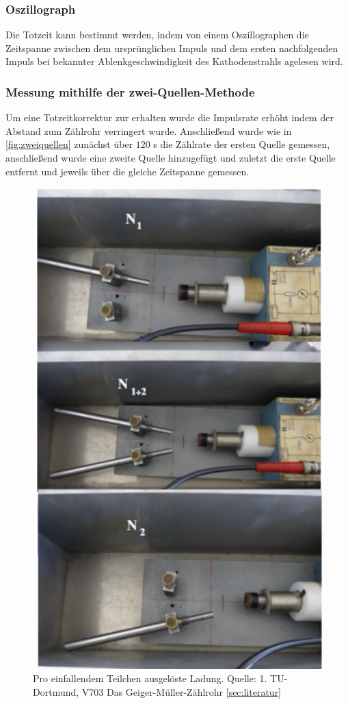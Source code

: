 \subsubsection{Oszillograph}
Die Totzeit kann bestimmt werden, indem von einem Oszillographen die Zeitspanne 
zwischen dem ursprünglichen Impuls und dem ersten nachfolgenden Impuls bei bekannter Ablenkgeschwindigkeit 
des Kathodenstrahls agelesen wird.
\subsubsection{Messung mithilfe der zwei-Quellen-Methode}
Um eine Totzeitkorrektur zur erhalten wurde die Impulsrate erhöht indem der Abstand zum Zählrohr verringert 
wurde. Anschließend wurde wie in \autoref{fig:zweiquellen} zunächst über $120$ s die Zählrate der ersten Quelle gemessen, anschließend wurde 
eine zweite Quelle hinzugefügt und zuletzt die erste Quelle entfernt und jeweils über die gleiche Zeitspanne 
gemessen.
\begin{figure}
    \centering
    \includegraphics{Zweiquellenmethode.pdf}
    \caption{Pro einfallendem Teilchen ausgelöste Ladung. Quelle: 1. TU-Dortmund, V703 Das Geiger-Müller-Zählrohr
    \autoref{sec:literatur}}
    \label{fig:zweiquellen}
  \end{figure}
